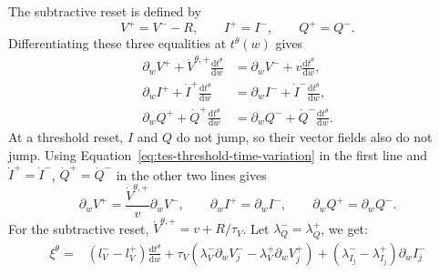 The subtractive reset is defined by
\begin{equation}
    V^+=V^- -R,
    \qquad I^+=I^-,
    \qquad Q^+=Q^-.
    \label{eq:tes-threshold-transition-proof}
\end{equation}
Differentiating these three equalities at $t^\theta(w)$ gives
\begin{align}
    \partial_wV^+
      +\dot V^{\theta,+}\frac{\mathrm dt^\theta}{\mathrm dw}
      &=
      \partial_wV^-
      +v\frac{\mathrm dt^\theta}{\mathrm dw},
      \label{eq:tes-reset-differentiate-v}\\
    \partial_wI^+
      +\dot I^+\frac{\mathrm dt^\theta}{\mathrm dw}
      &=
      \partial_wI^-
      +\dot I^-\frac{\mathrm dt^\theta}{\mathrm dw},
      \label{eq:tes-reset-differentiate-i}\\
    \partial_wQ^+
      +\dot Q^+\frac{\mathrm dt^\theta}{\mathrm dw}
      &=
      \partial_wQ^-
      +\dot Q^-\frac{\mathrm dt^\theta}{\mathrm dw}.
      \label{eq:tes-reset-differentiate-q}
\end{align}
At a threshold reset, $I$ and $Q$ do not jump, so their vector fields also do
not jump. Using Equation~\eqref{eq:tes-threshold-time-variation} in the first
line and $\dot I^+=\dot I^-$, $\dot Q^+=\dot Q^-$ in the other two lines gives
\begin{equation}
    \partial_wV^+
      =\frac{\dot V^{\theta,+}}{v}\partial_wV^-,
    \qquad
    \partial_wI^+=\partial_wI^-,
    \qquad
    \partial_wQ^+=\partial_wQ^-.
    \label{eq:tes-reset-partial-derivatives}
\end{equation}
For the subtractive reset,
$\dot V^{\theta,+}=v+R/\tau_V$. Let $\lambda_Q^-=\lambda_Q^+$, we get:
\begin{align}
    \xi^\theta={}&
     \left(l_V^- -l_V^+\right)\frac{\mathrm dt^\theta}{\mathrm dw}
     +\tau_V\left(
        \lambda_V^-\partial_w V_j^-
        -\lambda_V^+\partial_w V_j^+\right) +(\lambda_{I_j}^-
       -\lambda_{I_j}^+)\partial_wI_j^-
    \label{eq:tes-threshold_pre_threshold}
\end{align}

